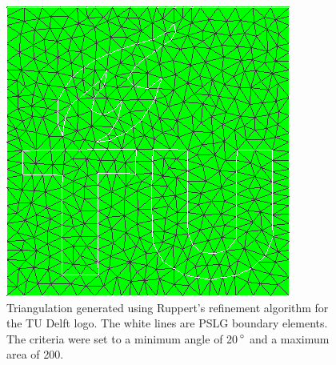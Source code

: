 \begin{figure}
    \centering
    \includegraphics[width=\columnwidth]{../images/TU_Ruppert20.png}
    \caption{Triangulation generated using Ruppert's refinement algorithm for the TU Delft logo. The white lines are PSLG boundary elements.
    The criteria were set to a minimum angle of 20$\,^{\circ}$ and a maximum area of 200.}
    \label{fig:result_TU20}
\end{figure}

